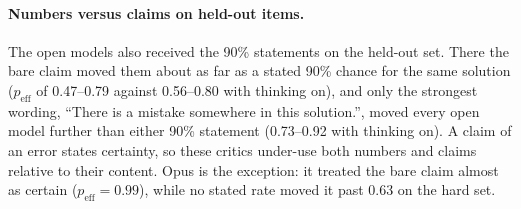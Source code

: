 \documentclass[letterpaper]{article} %
\newcommand{\peff}{p_{\mathrm{eff}}}
\begin{document}
\paragraph{Numbers versus claims on held-out items.} The open models also received the 90\% statements on the held-out set. There the bare claim moved them about as far as a stated 90\% chance for the same solution ($\peff$ of 0.47--0.79 against 0.56--0.80 with thinking on), and only the strongest wording, ``There is a mistake somewhere in this solution.'', moved every open model further than either 90\% statement (0.73--0.92 with thinking on). A claim of an error states certainty, so these critics under-use both numbers and claims relative to their content. Opus is the exception: it treated the bare claim almost as certain ($\peff=0.99$), while no stated rate moved it past 0.63 on the hard set.
\end{document}
